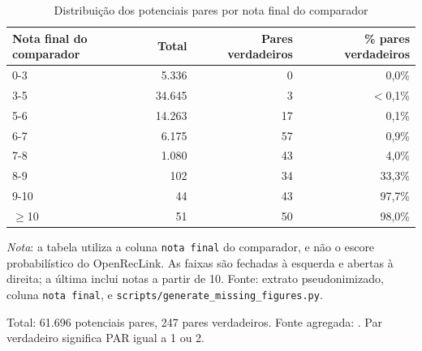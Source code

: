 \begin{table}[htbp]
\centering
\caption{Distribuição dos potenciais pares por nota final do comparador}
\label{tab:score-bands}
\begin{tabular}{lrrr}
\toprule
Nota final do comparador & Total & Pares verdadeiros & \% pares verdadeiros \\
\midrule
    0-3 & 5.336 & 0 & 0,0\% \\
    3-5 & 34.645 & 3 & $<$0,1\% \\
    5-6 & 14.263 & 17 & 0,1\% \\
    6-7 & 6.175 & 57 & 0,9\% \\
    7-8 & 1.080 & 43 & 4,0\% \\
    8-9 & 102 & 34 & 33,3\% \\
    9-10 & 44 & 43 & 97,7\% \\
    $\geq$10 & 51 & 50 & 98,0\% \\
\bottomrule
\end{tabular}

\smallskip
{\footnotesize\textit{Nota}: a tabela utiliza a coluna \texttt{nota final} do comparador, e não o escore probabilístico do OpenRecLink. As faixas são fechadas à esquerda e abertas à direita; a última inclui notas a partir de 10. Fonte: extrato pseudonimizado, coluna \texttt{nota final}, e \texttt{scripts/generate\_missing\_figures.py}.}
\par\footnotesize Total: 61.696 potenciais pares, 247 pares verdadeiros. Fonte agregada: . Par verdadeiro significa PAR igual a 1 ou 2.
\end{table}
